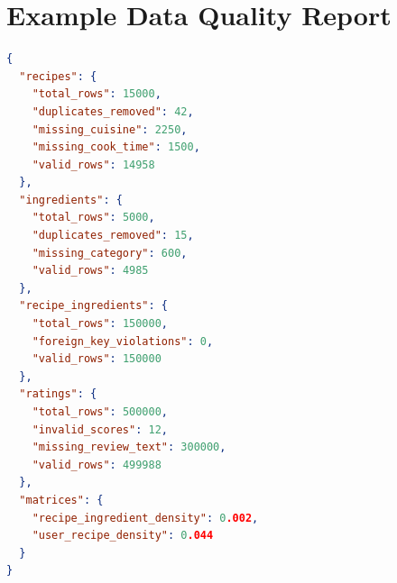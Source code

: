 \documentclass[11pt,a4paper]{article}
\begin{document}
\section{Example Data Quality Report}

\begin{lstlisting}[language=json, caption=Sample Quality Report Output]
{
  "recipes": {
    "total_rows": 15000,
    "duplicates_removed": 42,
    "missing_cuisine": 2250,
    "missing_cook_time": 1500,
    "valid_rows": 14958
  },
  "ingredients": {
    "total_rows": 5000,
    "duplicates_removed": 15,
    "missing_category": 600,
    "valid_rows": 4985
  },
  "recipe_ingredients": {
    "total_rows": 150000,
    "foreign_key_violations": 0,
    "valid_rows": 150000
  },
  "ratings": {
    "total_rows": 500000,
    "invalid_scores": 12,
    "missing_review_text": 300000,
    "valid_rows": 499988
  },
  "matrices": {
    "recipe_ingredient_density": 0.002,
    "user_recipe_density": 0.044
  }
}
\end{lstlisting}
\end{document}
